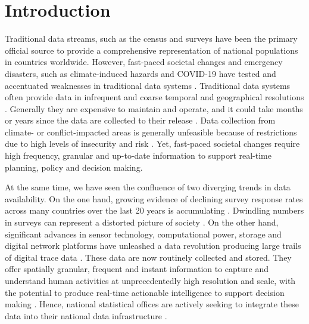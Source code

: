 \documentclass[]{rsos}%
\begin{document}
\providecommand{\EndFirstPage}{%
}

\maketitle

\newpage

\section{Introduction}\label{introduction}

Traditional data streams, such as the census and surveys have been the
primary official source to provide a comprehensive representation of
national populations in countries worldwide. However, fast-paced
societal changes and emergency disasters, such as climate-induced
hazards and COVID-19 have tested and accentuated weaknesses in
traditional data systems \citep{green2021}. Traditional data systems often
provide data in infrequent and coarse temporal and geographical
resolutions \citep{rowe23-bigdata}. Generally they are expensive to maintain
and operate, and it could take months or years since the data are
collected to their release \citep{rowe23-bigdata}. Data collection from
climate- or conflict-impacted areas is generally unfeasible because of
restrictions due to high levels of insecurity and risk
\citep{iradukunda2025}. Yet, fast-paced societal changes require high
frequency, granular and up-to-date information to support real-time
planning, policy and decision making.

At the same time, we have seen the confluence of two diverging trends in
data availability. On the one hand, growing evidence of declining survey
response rates across many countries over the last 20 years is
accumulating \citep{de2002trends, stedman2019, luiten2020}. Dwindling
numbers in surveys can represent a distorted picture of society
\citep{luiten2020}. On the other hand, significant advances in sensor
technology, computational power, storage and digital network platforms
have unleashed a data revolution producing large trails of digital trace
data \citep{kitchin2014data}. These data are now routinely collected and
stored. They offer spatially granular, frequent and instant information
to capture and understand human activities at unprecedentedly high
resolution and scale, with the potential to produce real-time actionable
intelligence to support decision making \citep{rowe23-bigdata, renninger2026a, rowe2026}. Hence, national statistical offices are
actively seeking to integrate these data into their national data
infrastructure \citep{unstatsMobilePhone2025, sdruk2025}.
\end{document}
